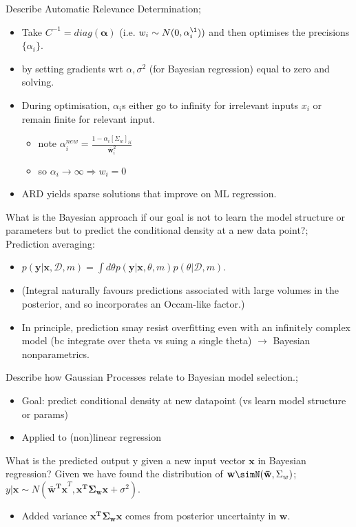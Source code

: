 \documentclass{article}
\begin{document}
Describe Automatic Relevance Determination; \begin{itemize}
    \item Take $C^{-1}=diag(\mathbf{\alpha})$ (i.e. $w_i\sim N(0, \alpha_i^{\1}))$ and then optimises the precisions $\{\alpha_i\}$.
    \item by setting gradients wrt $\alpha, \sigma^2$ (for Bayesian regression) equal to zero and solving.
    \item During optimisation, $\alpha_i$s either go to infinity for irrelevant inputs $x_i$ or remain finite for relevant input.
    \begin{itemize}
        \item note $\alpha_i^{new}=\frac{1-\alpha_i[\Sigma_w]_{ii}}{\mathbf{\bar{w}}^2_i}$
        \item so $\alpha_i\rightarrow\infty\Rightarrow w_i = 0$
    \end{itemize}
    \item ARD yields sparse solutions that improve on ML regression.
\end{itemize}


What is the Bayesian approach if our goal is not to learn the model structure or parameters but to predict the conditional density at a new data point?; Prediction averaging: \begin{itemize}
    \item  $p(\mathbf{y|x}, \mathcal{D}, m)=\int d\theta p(\mathbf{y|x}, \theta, m)p(\theta|\mathcal{D}, m)$.
    \item (Integral naturally favours predictions associated with  large volumes in the posterior, and so incorporates an Occam-like factor.)
    \item In principle, prediction smay resist overfitting even with an infinitely complex model (bc integrate over theta vs suing a single theta) $\rightarrow$ Bayesian nonparametrics.
\end{itemize}

Describe how Gaussian Processes relate to Bayesian model selection.; \begin{itemize}
    \item Goal: predict conditional density at new datapoint (vs learn model structure or params)
    \item Applied to (non)linear regression
\end{itemize}

What is the predicted output y given a new input vector $\mathbf{x}$ in Bayesian regression? Given we have found the distribution of $\mathbf{w}\simN(\mathbf{\bar{w}}, \Sigma_w)$; $y|\mathbf{x}\sim N(\mathbf{\bar{w}^Tx}^T, \mathbf{x^T\Sigma_w x}+\sigma^2)$. \begin{itemize}
    \item Added variance $\mathbf{x^T\Sigma_w x}$ comes from posterior uncertainty in $\mathbf{w}$.
\end{itemize}
\end{document}
